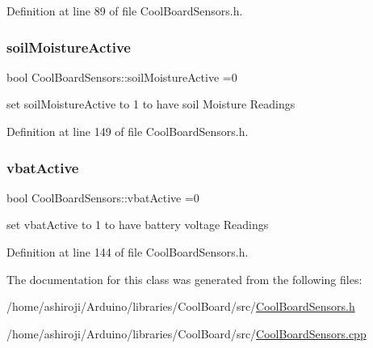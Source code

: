 Definition at line 89 of file Cool\+Board\+Sensors.\+h.

\mbox{\label{class_cool_board_sensors_ae7971bf527781ac4994309591b78ab89}} 
\subsubsection{\texorpdfstring{soil\+Moisture\+Active}{soilMoistureActive}}
{\footnotesize\ttfamily bool Cool\+Board\+Sensors\+::soil\+Moisture\+Active =0\hspace{0.3cm}{\ttfamily [private]}}

set soil\+Moisture\+Active to 1 to have soil Moisture Readings 

Definition at line 149 of file Cool\+Board\+Sensors.\+h.

\mbox{\label{class_cool_board_sensors_ab0b4bbae83796b52b90f91008d383583}} 
\subsubsection{\texorpdfstring{vbat\+Active}{vbatActive}}
{\footnotesize\ttfamily bool Cool\+Board\+Sensors\+::vbat\+Active =0\hspace{0.3cm}{\ttfamily [private]}}

set vbat\+Active to 1 to have battery voltage Readings 

Definition at line 144 of file Cool\+Board\+Sensors.\+h.



The documentation for this class was generated from the following files\+:\begin{DoxyCompactItemize}
\item 
/home/ashiroji/\+Arduino/libraries/\+Cool\+Board/src/\hyperlink{_cool_board_sensors_8h}{Cool\+Board\+Sensors.\+h}\item 
/home/ashiroji/\+Arduino/libraries/\+Cool\+Board/src/\hyperlink{_cool_board_sensors_8cpp}{Cool\+Board\+Sensors.\+cpp}\end{DoxyCompactItemize}
